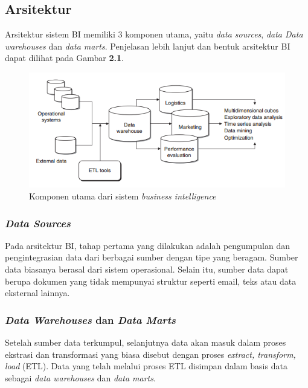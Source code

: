 \subsection{Arsitektur }
Arsitektur sistem BI memiliki 3 komponen utama, yaitu \textit{data sources}, \textit{data Data warehouses} dan \textit{data marts}. Penjelasan lebih lanjut dan bentuk arsitektur BI dapat dilihat pada Gambar \textbf{2.1}.

\begin{figure}[h]
	\centering
	\includegraphics{Gambar/arsitekturBI}
	\caption{Komponen utama dari sistem \textit{business intelligence} \cite{Carlo:2009}}
	\end{figure}

\subsubsection{\textit{Data Sources}} Pada arsitektur BI, tahap pertama yang dilakukan adalah pengumpulan dan pengintegrasian data dari berbagai sumber dengan tipe yang beragam. Sumber data biasanya berasal dari sistem operasional. Selain itu, sumber data dapat berupa dokumen yang tidak mempunyai struktur seperti email, teks atau data eksternal lainnya.\cite{Carlo:2009}

\subsubsection{\textit{Data Warehouses} dan \textit{Data Marts}} Setelah sumber data terkumpul, selanjutnya data akan masuk dalam proses ekstrasi dan transformasi yang biasa  disebut dengan proses \textit{extract, transform, load} (ETL). Data yang telah melalui proses ETL disimpan dalam basis data sebagai  \textit{data warehouses} dan \textit{data marts}. \cite{Carlo:2009}

